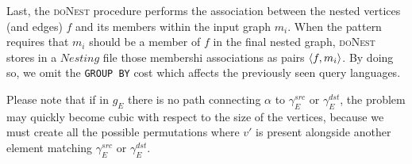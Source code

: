 Last, the \textsc{doNest} procedure performs the association between the nested vertices (and edges) $f$ and its members within the input graph $m_i$. When the pattern requires that $m_i$ should be a member of $f$ in the final nested graph,  \textsc{doNest} stores in a $Nesting$ file those membershi associations as pairs $\Braket{f,m_i}$. By doing so, we omit the \texttt{GROUP BY} cost which affects the previously seen query languages. 



Please note that if in $g_E$ there is no path connecting $\alpha$ to $\gamma_E^{src}$ or $\gamma_E^{dst}$, the problem may quickly become cubic with respect to the size of the vertices, because we must create all the possible permutations where $v'$ is present alongside another element matching $\gamma_E^{src}$ or $\gamma_E^{dst}$.
